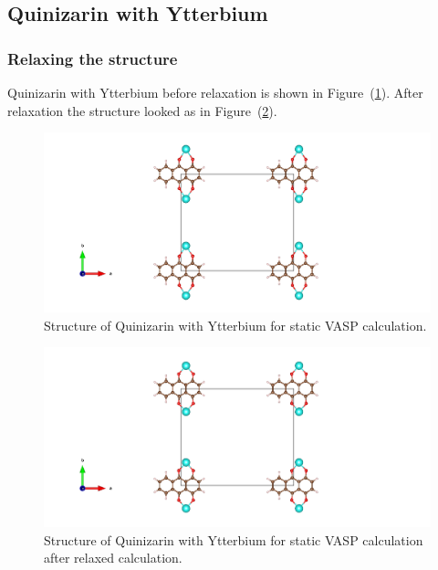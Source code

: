 \documentclass{article}
\begin{document}
      \vspace{1cm}

  \subsection{Quinizarin with Ytterbium}

    \subsubsection{Relaxing the structure}

      Quinizarin with Ytterbium before relaxation is shown in Figure~(\ref{fig:Yb_staticbefore_CONTCAR}). After relaxation the structure looked as in Figure~(\ref{fig:Yb_staticafter_CONTCAR}). \\

      \begin{figure}[H]
        \centering
        \includegraphics[width = \textwidth]{../fig/Yb_staticbefore_CONTCAR.png}
        \caption{Structure of Quinizarin with Ytterbium for static VASP calculation. }
        \label{fig:Yb_staticbefore_CONTCAR}
      \end{figure}

      \begin{figure}[H]
        \centering
        \includegraphics[width = \textwidth]{../fig/Yb_staticafter_CONTCAR.png}
        \caption{Structure of Quinizarin with Ytterbium for static VASP calculation after relaxed calculation. }
        \label{fig:Yb_staticafter_CONTCAR}
      \end{figure}
\end{document}
